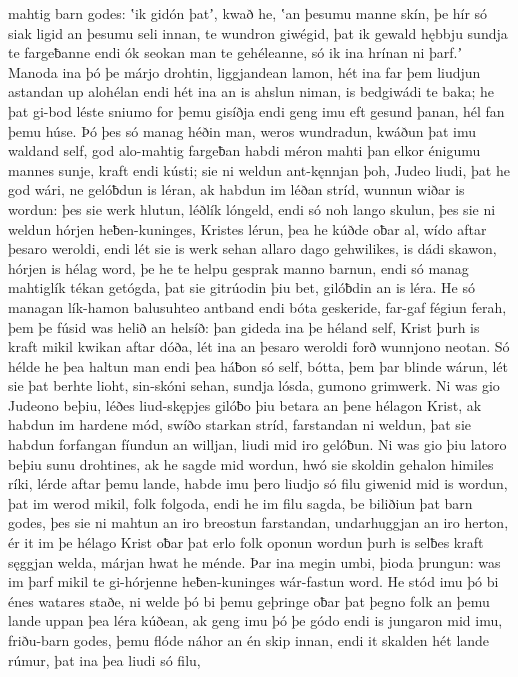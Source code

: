 mahtig barn godes: ʽik gidón þatʼ, kwað he, ʽan þesumu manne skín,
þe hír só siak ligid an þesumu seli innan,
te wundron giwégid, þat ik gewald hębbju
sundja te fargeƀanne endi ók seokan man
te gehéleanne, só ik ina hrínan ni þarf.ʼ
Manoda ina þó þe márjo drohtin,
liggjandean lamon, hét ina far þem liudjun astandan
up alohélan endi hét ina an is ahslun niman,
is bedgiwádi te baka; he þat gi-bod léste
sniumo for þemu gisíðja endi geng imu eft gesund þanan,
hél fan þemu húse. Þó þes só manag héðin man,
weros wundradun, kwáðun þat imu waldand self,
god alo-mahtig fargeƀan habdi
méron mahti þan elkor énigumu mannes sunje,
kraft endi kústi; sie ni weldun ant-kęnnjan þoh,
Judeo liudi, þat he god wári,
ne gelóƀdun is léran, ak habdun im léðan stríd,
wunnun wiðar is wordun: þes sie werk hlutun,
léðlík lóngeld, endi só noh lango skulun,
þes sie ni weldun hórjen heƀen-kuninges,
Kristes lérun, þea he kúðde oƀar al,
wído aftar þesaro weroldi, endi lét sie is werk sehan
allaro dago gehwilikes, is dádi skawon,
hórjen is hélag word, þe he te helpu gesprak
manno barnun, endi só manag mahtiglík
tékan getógda, þat sie gitrúodin þiu bet,
gilóƀdin an is léra. He só managan lík-hamon
balusuhteo antband endi bóta geskeride,
far-gaf fégiun ferah, þem þe fúsid was
helið an helsíð: þan gideda ina þe héland self,
Krist þurh is kraft mikil kwikan aftar dóða,
lét ina an þesaro weroldi forð wunnjono neotan.
Só hélde he þea haltun man endi þea háƀon só self,
bótta, þem þar blinde wárun, lét sie þat berhte lioht,
sin-skóni sehan, sundja lósda,
gumono grimwerk. Ni was gio Judeono beþiu,
léðes liud-skępjes gilóƀo þiu betara
an þene hélagon Krist, ak habdun im hardene mód,
swíðo starkan stríd, farstandan ni weldun,
þat sie habdun forfangan fíundun an willjan,
liudi mid iro gelóƀun. Ni was gio þiu latoro beþiu
sunu drohtines, ak he sagde mid wordun,
hwó sie skoldin gehalon himiles ríki,
lérde aftar þemu lande, habde imu þero liudjo só filu
giwenid mid is wordun, þat im werod mikil,
folk folgoda, endi he im filu sagda,
be biliðiun þat barn godes, þes sie ni mahtun an iro breostun farstandan,
undarhuggjan an iro herton, ér it im þe hélago Krist
oƀar þat erlo folk oponun wordun
þurh is selƀes kraft sęggjan welda,
márjan hwat he ménde. Þar ina megin umbi,
þioda þrungun: was im þarf mikil
te gi-hórjenne heƀen-kuninges
wár-fastun word. He stód imu þó bi énes watares staðe,
ni welde þó bi þemu geþringe oƀar þat þegno folk
an þemu lande uppan þea léra kúðean,
ak geng imu þó þe gódo endi is jungaron mid imu,
friðu-barn godes, þemu flóde náhor
an én skip innan, endi it skalden hét
lande rúmur, þat ina þea liudi só filu,
